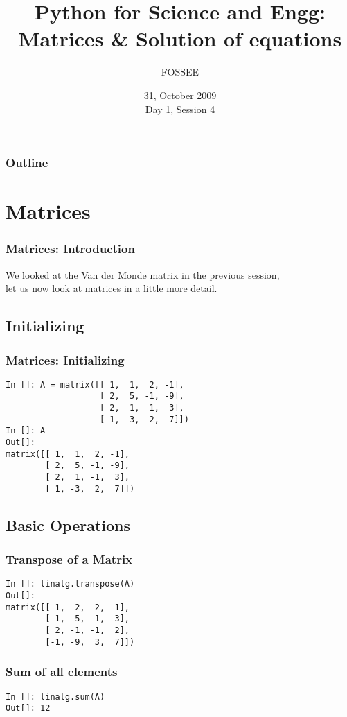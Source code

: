 \documentclass[14pt,compress]{beamer}
\title[Matrices \& Equations]{Python for Science and Engg: Matrices \& Solution of equations}
\author[FOSSEE] {FOSSEE}
\institute[IIT Bombay] {Department of Aerospace Engineering\\IIT Bombay}
\date[] {31, October 2009\\Day 1, Session 4}
\begin{document}
\begin{frame}
  \titlepage
\end{frame}

\begin{frame}
  \frametitle{Outline}
  \tableofcontents
\end{frame}

\section{Matrices}

\begin{frame}
\frametitle{Matrices: Introduction}
We looked at the Van der Monde matrix in the previous session,\\ 
let us now look at matrices in a little more detail.
\end{frame}

\subsection{Initializing}
\begin{frame}[fragile]
\frametitle{Matrices: Initializing}
\begin{lstlisting}
In []: A = matrix([[ 1,  1,  2, -1],
                   [ 2,  5, -1, -9],
                   [ 2,  1, -1,  3],
                   [ 1, -3,  2,  7]])
In []: A
Out[]: 
matrix([[ 1,  1,  2, -1],
        [ 2,  5, -1, -9],
        [ 2,  1, -1,  3],
        [ 1, -3,  2,  7]])
\end{lstlisting}
\end{frame}

\subsection{Basic Operations}

\begin{frame}[fragile]
\frametitle{Transpose of a Matrix}
\begin{lstlisting}
In []: linalg.transpose(A)
Out[]:
matrix([[ 1,  2,  2,  1],
        [ 1,  5,  1, -3],
        [ 2, -1, -1,  2],
        [-1, -9,  3,  7]])
\end{lstlisting}
\end{frame}

\begin{frame}[fragile]
  \frametitle{Sum of all elements}
  \begin{lstlisting}
In []: linalg.sum(A)
Out[]: 12
  \end{lstlisting}
\end{frame}
\end{document}
